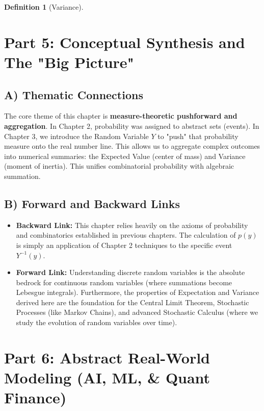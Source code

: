 \documentclass[11pt,letterpaper]{article}
\theoremstyle{definition}
\newtheorem{definition}{Definition}[section]
\theoremstyle{plain}
\theoremstyle{remark}
\begin{document}
\begin{definition}[Variance]
\newpage
\section{Part 5: Conceptual Synthesis and The "Big Picture"}

\subsection{A) Thematic Connections}
The core theme of this chapter is \textbf{measure-theoretic pushforward and aggregation}. In Chapter 2, probability was assigned to abstract sets (events). In Chapter 3, we introduce the Random Variable $Y$ to "push" that probability measure onto the real number line. This allows us to aggregate complex outcomes into numerical summaries: the Expected Value (center of mass) and Variance (moment of inertia). This unifies combinatorial probability with algebraic summation.

\subsection{B) Forward and Backward Links}
\begin{itemize}
    \item \textbf{Backward Link:} This chapter relies heavily on the axioms of probability and combinatorics established in previous chapters. The calculation of $p(y)$ is simply an application of Chapter 2 techniques to the specific event $Y^{-1}(y)$.
    \item \textbf{Forward Link:} Understanding discrete random variables is the absolute bedrock for continuous random variables (where summations become Lebesgue integrals). Furthermore, the properties of Expectation and Variance derived here are the foundation for the Central Limit Theorem, Stochastic Processes (like Markov Chains), and advanced Stochastic Calculus (where we study the evolution of random variables over time).
\end{itemize}

\section{Part 6: Abstract Real-World Modeling (AI, ML, \& Quant Finance)}


\end{definition}
\end{document}
